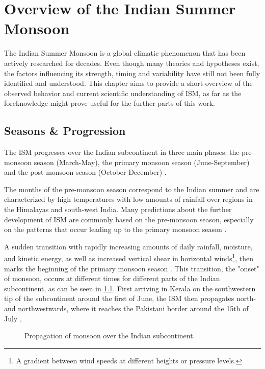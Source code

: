 \chapter{Overview of the Indian Summer Monsoon}
\label{c:ism_overview}
The Indian Summer Monsoon is a global climatic phenomenon that has been actively researched for decades. Even though many theories and hypotheses exist, the factors influencing its strength, timing and variability have still not been fully identified and understood. This chapter aims to provide a short overview of the observed behavior and current scientific understanding of ISM, as far as the foreknowledge might prove useful for the further parts of this work.

\section{Seasons \& Progression}
\label{st:ism_seasons}
The ISM progresses over the Indian subcontinent in three main phases: the pre-monsoon season (March-May), the primary monsoon season (June-September) and the post-monsoon season (October-December) \citep{Stolbova.2015}.

The months of the pre-monsoon season correspond to the Indian summer and are characterized by high temperatures with low amounts of rainfall over regions in the Himalayas and south-west India. Many predictions about the further development of ISM are commonly based on the pre-monsoon season, especially on the patterns that occur leading up to the primary monsoon season \citep{Stolbova.2015}.

A sudden transition with rapidly increasing amounts of daily rainfall, moisture, and kinetic energy, as well as increased vertical shear in horizontal winds\footnote{A gradient between wind speeds at different heights or pressure levels.}, then marks the beginning of the primary monsoon season \citep{Pradhan.2017}. This transition, the "onset" of monsoon, occurs at different times for different parts of the Indian subcontinent, as can be seen in \cref{fig:onset_propagation}. First arriving in Kerala on the southwestern tip of the subcontinent around the first of June, the ISM then propagates north- and northwestwards, where it reaches the Pakistani border around the 15th of July \citep{Willetts.2017}.

\begin{figure}[h]
  \caption{Propagation of monsoon over the Indian subcontinent.}
  \label{fig:onset_propagation}
\end{figure}

